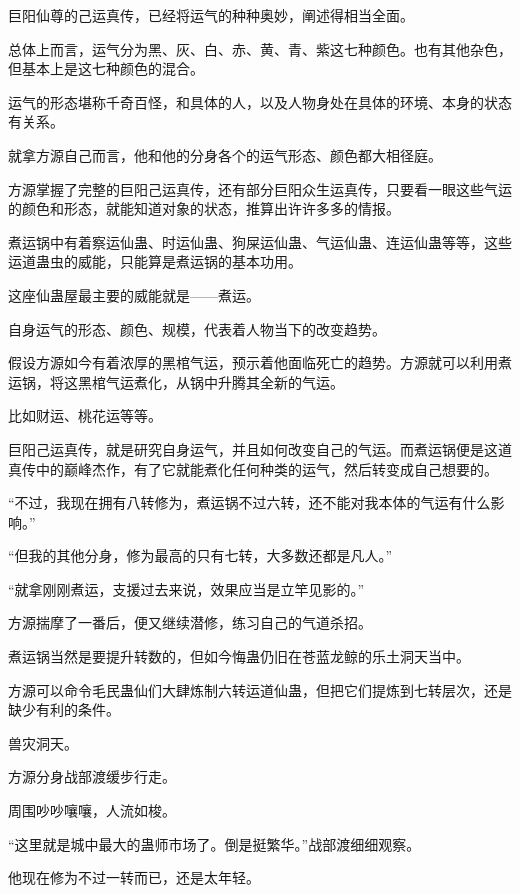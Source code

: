 
\begin{this_body}

巨阳仙尊的己运真传，已经将运气的种种奥妙，阐述得相当全面。

总体上而言，运气分为黑、灰、白、赤、黄、青、紫这七种颜色。也有其他杂色，但基本上是这七种颜色的混合。

运气的形态堪称千奇百怪，和具体的人，以及人物身处在具体的环境、本身的状态有关系。

就拿方源自己而言，他和他的分身各个的运气形态、颜色都大相径庭。

方源掌握了完整的巨阳己运真传，还有部分巨阳众生运真传，只要看一眼这些气运的颜色和形态，就能知道对象的状态，推算出许许多多的情报。

煮运锅中有着察运仙蛊、时运仙蛊、狗屎运仙蛊、气运仙蛊、连运仙蛊等等，这些运道蛊虫的威能，只能算是煮运锅的基本功用。

这座仙蛊屋最主要的威能就是——煮运。

自身运气的形态、颜色、规模，代表着人物当下的改变趋势。

假设方源如今有着浓厚的黑棺气运，预示着他面临死亡的趋势。方源就可以利用煮运锅，将这黑棺气运煮化，从锅中升腾其全新的气运。

比如财运、桃花运等等。

巨阳己运真传，就是研究自身运气，并且如何改变自己的气运。而煮运锅便是这道真传中的巅峰杰作，有了它就能煮化任何种类的运气，然后转变成自己想要的。

“不过，我现在拥有八转修为，煮运锅不过六转，还不能对我本体的气运有什么影响。”

“但我的其他分身，修为最高的只有七转，大多数还都是凡人。”

“就拿刚刚煮运，支援过去来说，效果应当是立竿见影的。”

方源揣摩了一番后，便又继续潜修，练习自己的气道杀招。

煮运锅当然是要提升转数的，但如今悔蛊仍旧在苍蓝龙鲸的乐土洞天当中。

方源可以命令毛民蛊仙们大肆炼制六转运道仙蛊，但把它们提炼到七转层次，还是缺少有利的条件。

兽灾洞天。

方源分身战部渡缓步行走。

周围吵吵嚷嚷，人流如梭。

“这里就是城中最大的蛊师市场了。倒是挺繁华。”战部渡细细观察。

他现在修为不过一转而已，还是太年轻。


\end{this_body}

